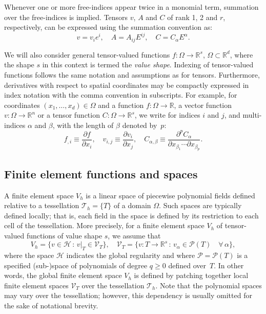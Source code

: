\documentclass[prodmode,acmtoms]{acmsmall}
\newcommand{\R}{\mathbb{R}}
\newcommand{\foralls}{\forall\,}
\begin{document}
Whenever one or more free-indices appear twice in a monomial term,
summation over the free-indices is implied. Tensors $v$, $A$ and $C$
of rank 1, 2 and $r$, respectively, can be expressed using the summation
convention as:
\begin{equation}
  v = v_i e^i,
  \quad
  A = A_{ij} E^{ij},
  \quad
  C = C_{\alpha} E^{\alpha}.
\end{equation}

We will also consider general tensor-valued functions $f: \Omega
\rightarrow \R^s$, $\Omega \subset \R^d$, where the shape $s$ in this
context is termed the \emph{value shape}. Indexing of tensor-valued
functions follows the same notation and assumptions as for
tensors. Furthermore, derivatives with respect to spatial coordinates
may be compactly expressed in index notation with the comma convention
in subscripts. For example, for coordinates $(x_1, \dots, x_d) \in
\Omega$ and a function $f: \Omega \rightarrow \R$, a vector function
$v: \Omega \rightarrow \R^{n}$ or a tensor function $C: \Omega
\rightarrow \R^{s}$, we write for indices $i$ and $j$, and multi-indices
$\alpha$ and $\beta$, with the length of $\beta$ denoted by~$p$:
\begin{equation}
  f_{,i} \equiv \frac{\partial f}{\partial x_i},
  \quad
  v_{i,j} \equiv \frac{\partial v_i}{\partial x_j},
  \quad
  C_{\alpha, \beta} \equiv
    \frac{\partial^p C_\alpha}{\partial x_{\beta_1} \cdots
          \partial x_{\beta_{p}}}.
\end{equation}
\subsection{Finite element functions and spaces}
\label{sec:finite_element}

A finite element space $V_h$ is a linear space of piecewise
polynomial fields defined relative to a tessellation $\mathcal{T}_h =
\{ T \}$ of a domain $\Omega$. Such spaces are typically defined
locally; that is, each field in the space is defined by its
restriction to each cell of the tessellation. More precisely, for a
finite element space $V_h$ of tensor-valued functions of value
shape $s$, we assume that
\begin{equation}
  \label{eq:finiteelement}
  V_h = \{v \in \mathcal{H} \,:\, v |_{T} \in \mathcal{V}_{T} \}, \quad
  \mathcal{V}_{T} = \{v : T \rightarrow \R^s \,:\, v_{\alpha} \in \mathcal{P}(T) \quad\foralls \alpha\},
\end{equation}
where the space $\mathcal{H}$ indicates the global regularity and
where $\mathcal{P} = \mathcal{P}(T)$ is a specified (sub-)space of
polynomials of degree $q \geqslant 0$ defined over~$T$. In other
words, the global finite element space $V_h$ is defined by patching
together local finite element spaces $\mathcal{V}_T$ over the
tessellation $\mathcal{T}_h$. Note that the polynomial spaces may vary
over the tessellation; however, this dependency is usually omitted for
the sake of notational brevity.
\end{document}
